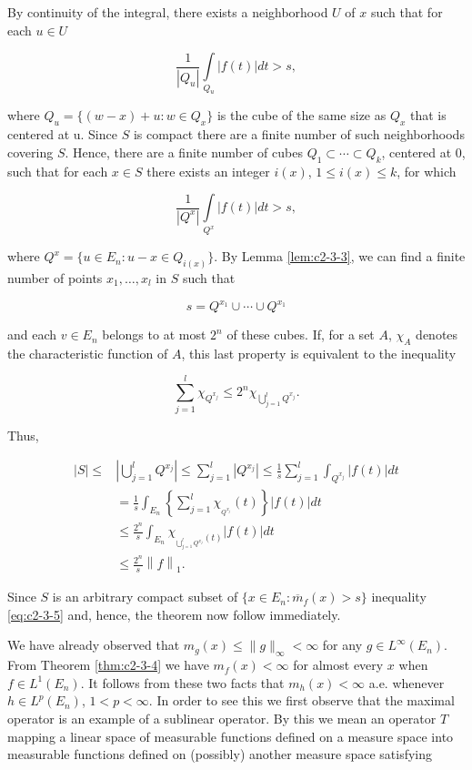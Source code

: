 By continuity of the integral, there exists a neighborhood $U$ of $x$ such that for each $u \in U$

\[
\frac{1}{\left|Q_{u}\right|}\int\limits_{Q_{u}}\left|f(t)\right|dt>s,
\]

where $Q_u = \{(w - x) + u: w \in Q_x\}$ is the cube of the same size as $Q_x$ that is centered at u. Since $S$ is compact there are a finite number of such neighborhoods covering $S$. Hence, there are a finite number of cubes $Q_1 \subset \cdots \subset Q_k$, centered at 0, such that for each $x \in S$ there exists an integer $i(x)$, $1 \leq i(x) \leq k$, for which

\[
\frac{1}{\left|Q^{x}\right|}\int\limits_{Q^{x}}\left|f(t)\right|dt>s,
\]

where $Q^x = \{u \in E_n: u - x \in Q_{i(x)}\}$. By Lemma \ref{lem:c2-3-3}, we can find a finite number of points $x_1, \ldots, x_l$ in $S$ such that

\[
s=Q^{x_{1}}\cup\cdots\cup Q^{x_{1}}
\]

and each $v\in E_n$ belongs to at most $2^n$ of these cubes. If, for a set $A$, $\chi_A$ denotes the characteristic function of $A$, this last property is equivalent to the inequality

\[
\sum_{j=1}^{l}\chi_{Q^{x_{j}}}\leq2^{n}\chi_{\bigcup_{j=1}^{l}Q^{x_{j}}}.
\]

Thus,

\[
\begin{aligned}|S|\leq&\left|\bigcup_{j=1}^{l}Q^{x_{j}}\right|\leq\sum_{j=1}^{l}|Q^{x_{j}}|\leq\frac{1}{s}\sum_{j=1}^{l}\int_{Q^{x_{j}}}|f(t)|dt\\ &=\frac{1}{s}\int_{E_{n}}\left\{\sum_{j=1}^{l}\chi_{_{Q^{x_{j}}}}(t)\right\}|f(t)|dt\\&\leq\frac{2^{n}}{s}\int_{E_{n}}\chi_{_{\bigcup_{j=1}^{l}Q^{x_{j}}}(t)}|f(t)|dt\\&\leq\frac{2^{n}}{s}\left\|f\right\|_{1}.\end{aligned}
\]

Since $S$ is an arbitrary compact subset of $\{x \in E_n: \overline{m}_f(x) > s\}$ inequality \eqref{eq:c2-3-5} and, hence, the theorem now follow immediately.

We have already observed that $m_g(x) \leq \|g\|_\infty < \infty$ for any $g \in L^\infty(E_n)$. From Theorem \ref{thm:c2-3-4} we have $m_f(x) < \infty$ for almost every $x$ when $f \in L^1(E_n)$. It follows from these two facts that $m_h(x) < \infty$ a.e. whenever $h \in L^p(E_n)$, $1 < p < \infty$. In order to see this we first observe that the maximal operator is an example of a sublinear operator. By this we mean an operator $T$ mapping a linear space of measurable functions defined on a measure space into measurable functions defined on (possibly) another measure space satisfying

